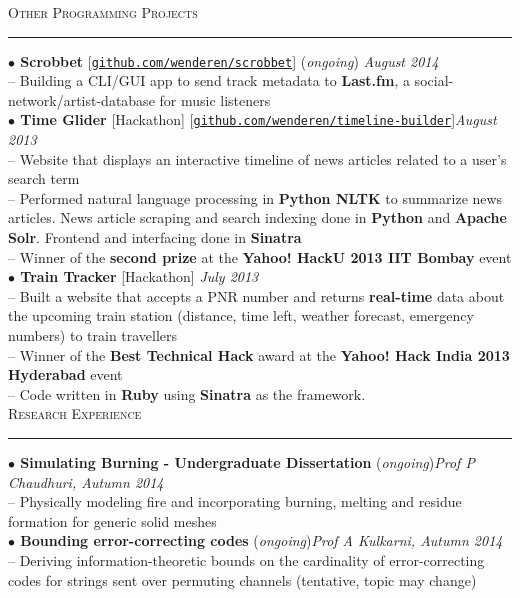 \documentclass[a4paper,9pt]{article}
\begin{document}
\Large{\textsc{Other Programming Projects}}\vspace{1.5pt}
\hrule\vspace{0.25cm}
\normalsize
\textbf{$\bullet$ Scrobbet} [\href{https://github.com/wenderen/scrobbet}{\texttt{github.com/wenderen/scrobbet}}] (\textit{ongoing}) \hfill \textit{August 2014}\\
-- Building a CLI/GUI app to send track metadata to \textbf{Last.fm}, a social-network/artist-database for music listeners\\
\textbf{$\bullet$ Time Glider} [Hackathon] [\href{https://github.com/wenderen/timeline-builder}{\texttt{github.com/wenderen/timeline-builder}}]\hfill \textit{August 2013}\\
-- Website that displays an interactive timeline of news articles related to a user's search term\\
-- Performed natural language processing in \textbf{Python NLTK} to summarize news articles. News article scraping and search indexing done in \textbf{Python} and \textbf{Apache Solr}. Frontend and interfacing done in \textbf{Sinatra}\\
-- Winner of the \textbf{second prize} at the \textbf{Yahoo! HackU 2013 IIT Bombay} event\\
\textbf{$\bullet$ Train Tracker} [Hackathon] \hfill \textit{July 2013}\\
-- Built a website that accepts a PNR number and returns \textbf{real-time} data about the upcoming train station (distance, time left, weather forecast, emergency numbers) to train travellers\\
-- Winner of the \textbf{Best Technical Hack} award at the \textbf{Yahoo! Hack India 2013 Hyderabad} event\\
-- Code written in \textbf{Ruby} using \textbf{Sinatra} as the framework.\\

\Large{\textsc{Research Experience}}\vspace{1.5pt}
\hrule\vspace{0.25cm}
\normalsize
\textbf{$\bullet$ Simulating Burning - Undergraduate Dissertation} (\textit{ongoing})\hfill \textit{Prof P Chaudhuri, Autumn 2014}\\
-- Physically modeling fire and incorporating burning, melting and residue formation for generic solid meshes\\
\textbf{$\bullet$ Bounding error-correcting codes} (\textit{ongoing})\hfill \textit{Prof A Kulkarni, Autumn 2014}\\
-- Deriving information-theoretic bounds on the cardinality of error-correcting codes for strings sent over permuting channels (tentative, topic may change)\\
\end{document}
